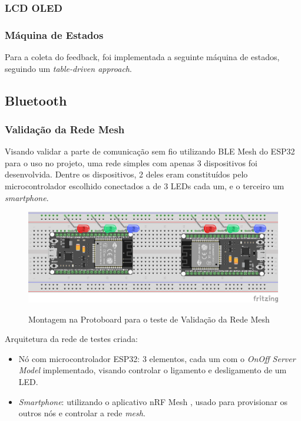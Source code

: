 \documentclass[../monografia.tex]{subfiles}
\begin{document}
\subsubsection{LCD OLED}
\subsubsection{Máquina de Estados}

Para a coleta do feedback, foi implementada a seguinte máquina de estados, seguindo um \textit{table-driven approach}.



\subsection{Bluetooth}
\subsubsection{Validação da Rede Mesh}

Visando validar a parte de comunicação sem fio utilizando BLE Mesh do ESP32 para o uso no projeto, uma rede simples com apenas 3 dispositivos foi desenvolvida. Dentre os dispositivos, 2 deles eram constituídos pelo microcontrolador escolhido conectados a de 3 LEDs cada um, e o terceiro um \textit{smartphone}. 

\begin{figure}[h]
	\centering
		\includegraphics[width=.8\textwidth]{mesh_test}
		\label{fig:test}
		\caption{Montagem na Protoboard para o teste de Validação da Rede Mesh}
\end{figure}

Arquitetura da rede de testes criada:

\begin{itemize}
	\item Nó com microcontrolador ESP32: 3 elementos, cada um com o \textit{OnOff Server Model} \cite{ble-mesh-models} implementado, visando controlar o ligamento e desligamento de um LED.
	\item \textit{Smartphone}: utilizando o aplicativo nRF Mesh \cite{nrf-app}, usado para provisionar os outros nós e controlar a rede \textit{mesh}.
\end{itemize}
\end{document}
